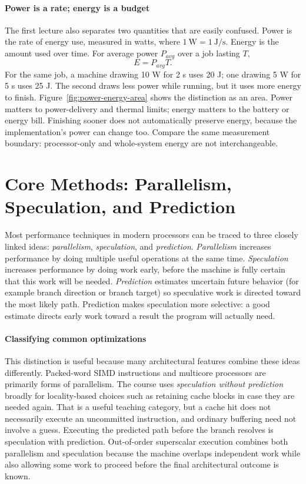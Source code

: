 \paragraph{Power is a rate; energy is a budget}
The first lecture also separates two quantities that are easily confused.
Power is the rate of energy use, measured in watts, where $1\ \mathrm{W}=1\ \mathrm{J/s}$.
Energy is the amount used over time.
For average power $P_{avg}$ over a job lasting $T$,
\begin{equation}\label{eq:intro-job-energy}
    E=P_{avg}T.
\end{equation}
For the same job, a machine drawing 10 W for 2 s uses 20 J; one drawing 5 W for 5 s uses 25 J.
The second draws less power while running, but it uses more energy to finish.
Figure~\ref{fig:power-energy-area} shows the distinction as an area.
Power matters to power-delivery and thermal limits; energy matters to the battery or energy bill.
Finishing sooner does not automatically preserve energy, because the implementation's power can change too.
Compare the same measurement boundary: processor-only and whole-system energy are not interchangeable.




\section{Core Methods: Parallelism, Speculation, and Prediction}\label{sec:auto-004}
Most performance techniques in modern processors can be traced to three closely linked ideas: \textit{parallelism}, \textit{speculation}, and \textit{prediction}.
\textit{Parallelism} increases performance by doing multiple useful operations at the same time.
\textit{Speculation} increases performance by doing work early, before the machine is fully certain that this work will be needed.
\textit{Prediction} estimates uncertain future behavior (for example branch direction or branch target) so speculative work is directed toward the most likely path.
Prediction makes speculation more selective: a good estimate directs early work toward a result the program will actually need.

\paragraph{Classifying common optimizations}\label{par:auto-005a}
This distinction is useful because many architectural features combine these ideas differently.
Packed-word SIMD instructions and multicore processors are primarily forms of parallelism.
The course uses \emph{speculation without prediction} broadly for locality-based choices such as retaining cache blocks in case they are needed again.
That is a useful teaching category, but a cache hit does not necessarily execute an uncommitted instruction, and ordinary buffering need not involve a guess.
Executing the predicted path before the branch resolves is speculation with prediction.
Out-of-order superscalar execution combines both parallelism and speculation because the machine overlaps independent work while also allowing some work to proceed before the final architectural outcome is known.

